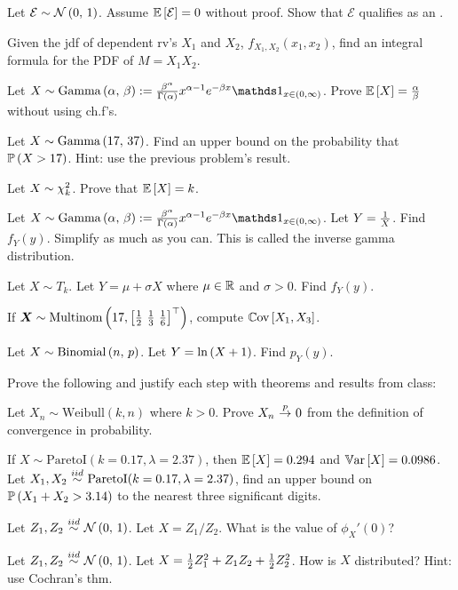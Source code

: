 \documentclass[12pt]{article}
\begin{document}
\begin{enumerate}[(a)]

 Let $\mathcal{E} \sim \mathcal{N}\left(0,\,1\right)$. Assume $\mathbb{E}\left[\mathcal{E}\right] = 0$ without proof. Show that $\mathcal{E}$ qualifies as an .

 Given the jdf of dependent rv's $X_1$ and $X_2$, $f_{X_1, X_2}(x_1, x_2)$, find an integral formula for the PDF of $M = X_1 X_2$.

 Let $X \sim \gammanot{\alpha}{\beta} := \frac{\beta^\alpha}{\Gamma\parens{\alpha}} x^{\alpha - 1} e^{-\beta x} \indic{x \in (0, \infty)}$. Prove $\mathbb{E}\left[X\right] = \frac{\alpha}{\beta}$ without using ch.f's. 

 Let $X \sim \mathrm{Gamma}\left(17,\,37\right)$. Find an upper bound on the probability that $\mathbb{P}\left(X > 17\right)$. Hint: use the previous problem's result. 

 Let $X \sim \chi^2_{k}$. Prove that $\mathbb{E}\left[X\right] = k$. 

 Let $X \sim \gammanot{\alpha}{\beta} := \frac{\beta^\alpha}{\Gamma\parens{\alpha}} x^{\alpha - 1} e^{-\beta x} \indic{x \in (0, \infty)}$. Let $Y = \frac{1}{X}$. Find $f_Y(y)$. Simplify as much as you can. This is called the inverse gamma distribution.

 Let $X \sim T_{k}$. Let $Y = \mu + \sigma X$ where $\mu \in \mathbb{R}$ and $\sigma > 0$. Find $f_Y(y)$.

 If $\boldsymbol{X} \sim \text{Multinom}\left(17, \left[\frac{1}{2} ~\frac{1}{3} ~\frac{1}{6}\right]^\top\right)$, compute $\mathbb{C}\text{ov}\left[X_1, X_3\right]$.

 Let $X \sim \mathrm{Binomial}\left(n,\,p\right)$. Let $Y = \ln\left(X+1\right)$. Find $p_Y(y)$. 


 Prove the following and justify each step with theorems and results from class:

\beqn
{} \convd \stdnormnot
\eeqn{}

 Let $X_n \sim \text{Weibull}(k, n)$ where $k > 0$. Prove $X_n \convp 0$ from the definition of convergence in probability.

 If $X \sim \text{ParetoI}(k = 0.17, \lambda = 2.37)$, then $\mathbb{E}\left[X\right] = 0.294$ and $\mathbb{V}\text{ar}\left[X\right] =  0.0986$. Let $X_1, X_2 \iid \text{ParetoI}(k = 0.17, \lambda = 2.37)$, find an upper bound on $\mathbb{P}\left(X_1 + X_2 > 3.14\right)$ to the nearest three significant digits.


 Let $Z_1, Z_2 \iid \stdnormnot$. Let $X = Z_1 / Z_2$. What is the value of $\phi_X'(0)$?

 Let $Z_1, Z_2 \iid \stdnormnot$. Let $X = \frac{1}{2} Z_1^2 + Z_1 Z_2 + \frac{1}{2} Z_2^2$. How is $X$ distributed? Hint: use Cochran's thm.

\end{enumerate}
\end{document}
